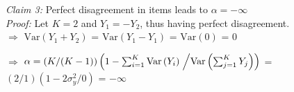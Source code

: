 \documentclass{article}\usepackage[]{graphicx}\usepackage[]{color}
\newcommand{\V}[1]{\text{Var}\left(#1\right)}
\begin{document}
{\vspace{.25in} %

\textit{Claim 3:} Perfect disagreement in items leads to $\alpha = -\infty$ \\

\textit{Proof:} Let $K=2$ and $Y_1 = -Y_2$, thus having perfect disagreement.\\

$\Rightarrow$  $\V{Y_1 + Y_2}$ = $\V{Y_1 - Y_1}$ = $\V{0}$ = $0$

$\Rightarrow$  $\alpha = \left(K/(K-1)\right) \left( 1- \sum_{i=1}^K \V{Y_i} \right.\left/  \V{\sum_{j=1}^K Y_j}  \right)$ = $(2/1)(1-2\sigma^2_y/0)$ = $-\infty$ \\

} %
\end{document}
